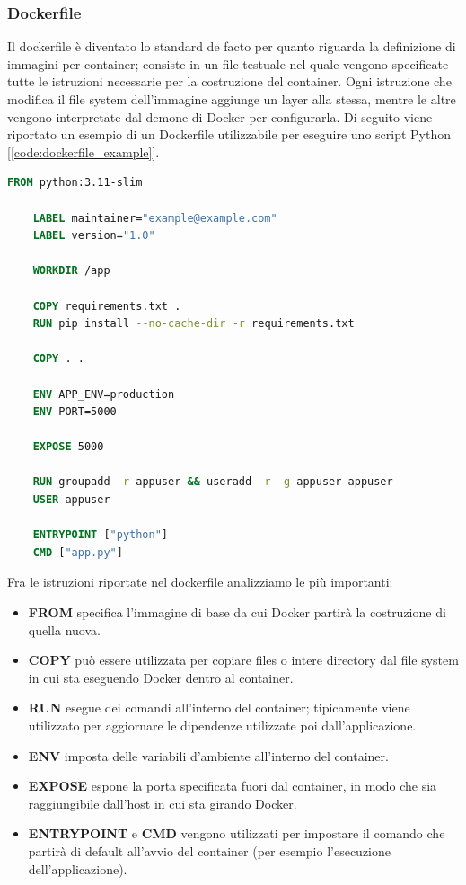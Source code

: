 \subsubsection{Dockerfile}

Il dockerfile è diventato lo standard de facto per quanto riguarda la definizione di immagini per container; consiste in un file testuale nel quale vengono specificate tutte le istruzioni necessarie per la costruzione del container. Ogni istruzione che modifica il file system dell'immagine aggiunge un layer alla stessa, mentre le altre vengono interpretate dal demone di Docker per configurarla.
Di seguito viene riportato un esempio di un Dockerfile utilizzabile per eseguire uno script Python [\ref{code:dockerfile_example}].

\vspace{0.5cm}
\begin{lstlisting}[language=Dockerfile, caption={Esempio Dockerfile per script Python}, captionpos=b, label={code:dockerfile_example}]
    FROM python:3.11-slim
    
    LABEL maintainer="example@example.com"
    LABEL version="1.0"
    
    WORKDIR /app
    
    COPY requirements.txt .
    RUN pip install --no-cache-dir -r requirements.txt
    
    COPY . .
    
    ENV APP_ENV=production
    ENV PORT=5000
    
    EXPOSE 5000
    
    RUN groupadd -r appuser && useradd -r -g appuser appuser
    USER appuser
    
    ENTRYPOINT ["python"]
    CMD ["app.py"]
\end{lstlisting}

Fra le istruzioni riportate nel dockerfile analizziamo le più importanti:
\begin{itemize}
    \item \textbf{FROM} specifica l'immagine di base da cui Docker partirà la costruzione di quella nuova.
    \item \textbf{COPY} può essere utilizzata per copiare files o intere directory dal file system in cui sta eseguendo Docker dentro al container.
    \item \textbf{RUN} esegue dei comandi all'interno del container; tipicamente viene utilizzato per aggiornare le dipendenze utilizzate poi dall'applicazione.
    \item \textbf{ENV} imposta delle variabili d'ambiente all'interno del container.
    \item \textbf{EXPOSE} espone la porta specificata fuori dal container, in modo che sia raggiungibile dall'host in cui sta girando Docker.
    \item \textbf{ENTRYPOINT} e \textbf{CMD} vengono utilizzati per impostare il comando che partirà di default all'avvio del container (per esempio l'esecuzione dell'applicazione).
\end{itemize}


